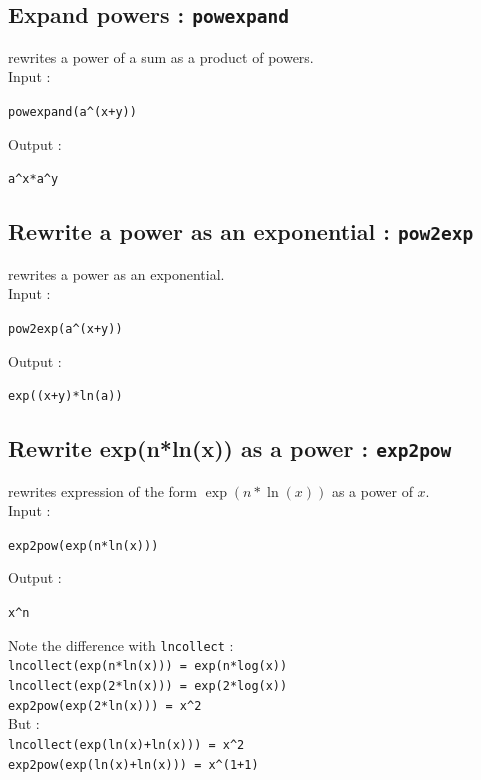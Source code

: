 \documentclass[a4paper,11pt]{book}
\begin{document}
\subsection{Expand powers : {\tt powexpand}}
 rewrites a power of a sum as a product of powers.\\
Input :
\begin{center}{\tt powexpand(a\verb|^|(x+y))}\end{center}
Output :
\begin{center}{\tt a\verb|^|x*a\verb|^|y}\end{center}


\subsection{Rewrite a power as an exponential : {\tt pow2exp}}
 rewrites a power as an exponential.\\
Input :
\begin{center}{\tt  pow2exp(a\verb|^|(x+y))}\end{center}
Output :
\begin{center}{\tt exp((x+y)*ln(a))}\end{center}

\subsection{Rewrite exp(n*ln(x)) as a power : {\tt exp2pow}}
 rewrites expression of the form $\exp(n*\ln(x))$
as a power of $x$.\\
Input :
\begin{center}{\tt  exp2pow(exp(n*ln(x)))}\end{center}
Output :
\begin{center}{\tt x\verb|^|n}\end{center}
Note the difference with {\tt lncollect} :\\
{\tt lncollect(exp(n*ln(x))) = exp(n*log(x))}\\
{\tt lncollect(exp(2*ln(x))) = exp(2*log(x))}\\
{\tt exp2pow(exp(2*ln(x))) = x\verb|^|2 }\\
But :\\
{\tt lncollect(exp(ln(x)+ln(x))) = x\verb|^|2}\\
{\tt exp2pow(exp(ln(x)+ln(x))) = x\verb|^|(1+1)}\\
\end{document}
